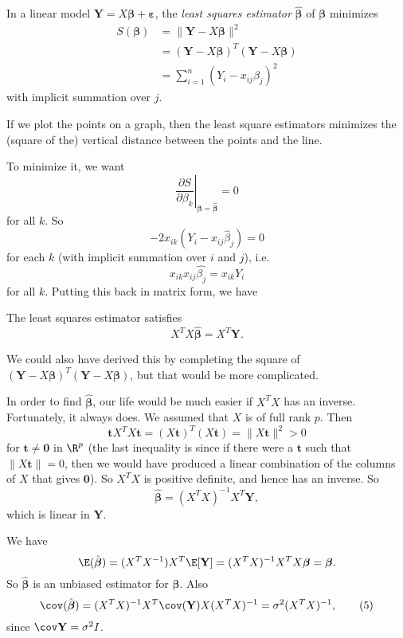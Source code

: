 \documentclass[a4paper]{article}
\begin{document}
\begin{defi}
  In a linear model $\mathbf{Y} = X\boldsymbol\beta + \boldsymbol\varepsilon$, the \emph{least squares estimator} $\hat{\boldsymbol\beta}$ of $\boldsymbol\beta$ minimizes
  \begin{align*}
    S(\boldsymbol\beta) &= \|\mathbf{Y} - X\boldsymbol\beta\|^2\\
    &= (\mathbf{Y} - X\boldsymbol\beta)^T(\mathbf{Y} - X\boldsymbol\beta)\\
    &= \sum_{i = 1}^n (Y_i - x_{ij}\beta_j)^2
  \end{align*}
  with implicit summation over $j$.

  If we plot the points on a graph, then the least square estimators minimizes the (square of the) vertical distance between the points and the line.
\end{defi}

To minimize it, we want
\[
  \left.\frac{\partial S}{\partial \beta_k}\right|_{\boldsymbol\beta = \hat{\boldsymbol\beta}} = 0
\]
for all $k$. So
\[
  -2 x_{ik}(Y_i - x_{ij}\hat{\beta}_j) = 0
\]
for each $k$ (with implicit summation over $i$ and $j$), i.e.
\[
  x_{ik}x_{ij}\hat{\beta_j} = x_{ik}Y_i
\]
for all $k$. Putting this back in matrix form, we have
\begin{prop}
  The least squares estimator satisfies
  \[
    X^TX\hat{\boldsymbol\beta} = X^T\mathbf{Y}.\tag{3}
  \]
\end{prop}
We could also have derived this by completing the square of $(\mathbf{Y} - X\boldsymbol\beta)^T(\mathbf{Y} - X\boldsymbol\beta)$, but that would be more complicated.

In order to find $\hat{\boldsymbol\beta}$, our life would be much easier if $X^TX$ has an inverse. Fortunately, it always does. We assumed that $X$ is of full rank $p$. Then
\[
  \mathbf{t}X^TX\mathbf{t} = (X\mathbf{t})^T(X\mathbf{t}) = \|X\mathbf{t}\|^2 > 0
\]
for $\mathbf{t}\not= \mathbf{0}$ in $\R^p$ (the last inequality is since if there were a $\mathbf{t}$ such that $\|X\mathbf{t}\| = 0$, then we would have produced a linear combination of the columns of $X$ that gives $\mathbf{0}$). So $X^TX$ is positive definite, and hence has an inverse. So
\[
  \hat{\boldsymbol\beta} = (X^TX)^{-1} X^T\mathbf{Y},\tag{4}
\]
which is linear in $\mathbf{Y}$.

We have
\[
  \E(\hat{\boldsymbol\beta}) = (X^TX^{-1})X^T\E[\mathbf{Y}] = (X^TX)^{-1}X^TX\boldsymbol\beta = \boldsymbol\beta.
\]
So $\hat{\boldsymbol\beta}$ is an unbiased estimator for $\boldsymbol\beta$. Also
\[
  \cov(\hat{\boldsymbol\beta}) = (X^TX)^{-1}X^T \cov(\mathbf{Y})X(X^TX)^{-1} = \sigma^2(X^TX)^{-1} ,\tag{5}
\]
since $\cov \mathbf{Y} = \sigma^2 I$.
\end{document}
